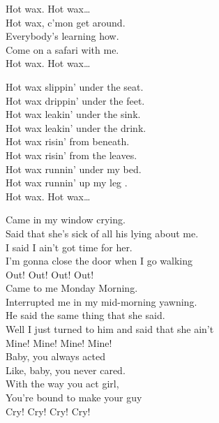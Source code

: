 Hot wax. Hot wax… \\

Hot wax, c'mon get around. \\
Everybody's learning how. \\
Come on a safari with me. \\

Hot wax. Hot wax… \\


Hot wax slippin' under the seat. \\
Hot wax drippin' under the feet. \\
Hot wax leakin' under the sink. \\
Hot wax leakin' under the drink. \\

Hot wax risin' from beneath. \\
Hot wax risin' from the leaves. \\
Hot wax runnin' under my bed. \\
Hot wax runnin' up my leg . \\

Hot wax. Hot wax… \\





Came in my window crying. \\
Said that she's sick of all his lying about me. \\
I said I ain't got time for her. \\
I'm gonna close the door when I go walking \\
Out! Out! Out! Out! \\

Came to me Monday Morning. \\
Interrupted me in my mid-morning yawning. \\
He said the same thing that she said. \\
Well I just turned to him and said that she ain't \\
Mine! Mine! Mine! Mine! \\

Baby, you always acted \\
Like, baby, you never cared. \\
With the way you act girl, \\
You're bound to make your guy \\
Cry! Cry! Cry! Cry! \\

